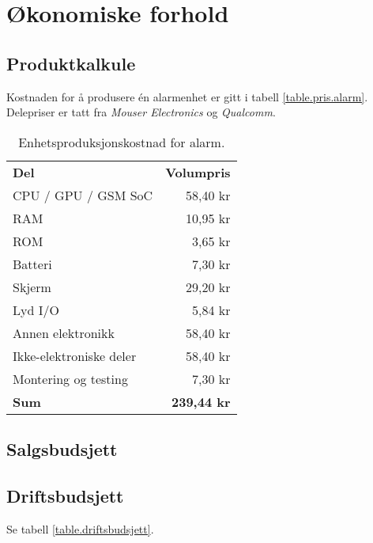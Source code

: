\section{Økonomiske forhold}

\subsection{Produktkalkule}

Kostnaden for å produsere én alarmenhet er gitt i tabell
\vref{table.pris.alarm}.  Delepriser er tatt fra \textit{Mouser Electronics} og
\textit{Qualcomm}.

\begin{table}
  \centering
  \begin{tabular}{lr}
    \textbf{Del} & \textbf{Volumpris} \\
    CPU / GPU / GSM SoC & 58,40 kr \\
    RAM       & 10,95 kr \\
    ROM       &  3,65 kr \\
    Batteri   &  7,30 kr \\
    Skjerm    & 29,20 kr \\
    Lyd I/O   &  5,84 kr \\
    Annen elektronikk & 58,40 kr \\
    Ikke-elektroniske deler & 58,40 kr \\
    Montering og testing & 7,30 kr \\
    \textbf{Sum} & \textbf{239,44 kr} \\
  \end{tabular}
  \caption{Enhetsproduksjonskostnad for alarm.}
  \label{table.pris.alarm}
\end{table}

\subsection{Salgsbudsjett}

\subsection{Driftsbudsjett}

Se tabell \vref{table.driftsbudsjett}.

